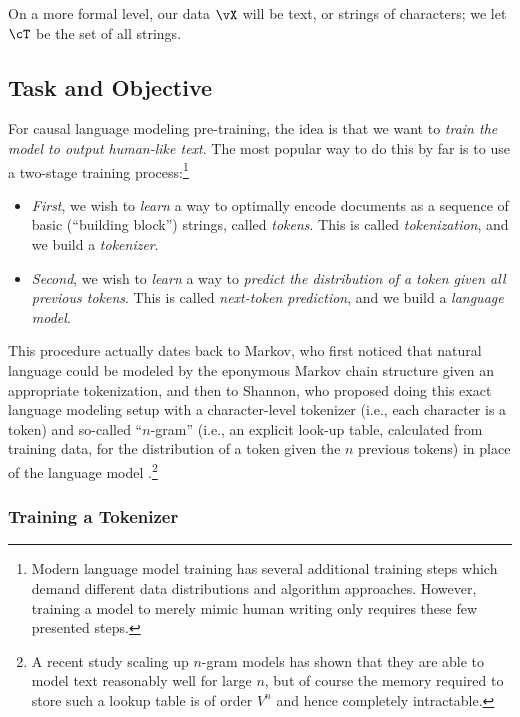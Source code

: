 \documentclass[../../book-main.tex]{subfiles}
\begin{document}
On a more formal level, our data \(\vX\) will be text, or strings of
characters; we let \(\cT\) be the set of all strings.

\subsection{Task and Objective} \label{sub:clm_text_objective}

For causal language modeling pre-training, the idea is that we want
to \textit{train the model to output human-like text}. The most
popular way to do this by far is to use a two-stage training
process:\footnote{Modern language model training has several
additional training steps which demand different data distributions
and algorithm approaches. However, training a model to merely mimic
human writing only requires these few presented steps.}
\begin{itemize}
\item \textit{First}, we wish to \textit{learn} a way to optimally
    encode documents as a sequence of basic (``building block'')
    strings, called \textit{tokens}. This is called
    \textit{tokenization}, and we build a \textit{tokenizer}.
\item \textit{Second}, we wish to \textit{learn} a way to
    \textit{predict the distribution of a token given all previous
    tokens}. This is called \textit{next-token prediction}, and we
    build a \textit{language model}.
\end{itemize}
This procedure actually dates back to Markov, who first noticed that
natural language could be modeled by the eponymous Markov chain
structure \citep{markov2006example} given an appropriate
tokenization, and then to Shannon, who proposed doing this exact
language modeling setup with a character-level tokenizer (i.e., each
character is a token) and so-called ``\(n\)-gram'' (i.e., an explicit
look-up table, calculated from training data, for the distribution of
a token given the \(n\) previous tokens) in place of the language
model \citep{Shannon-1948}.\footnote{A recent study
\citep{liu2024infini} scaling up \(n\)-gram models has shown that
they are able to model text reasonably well for large \(n\), but of
course the memory required to store such a lookup 
table is of order
\(V^{n}\) and hence completely intractable.}

\subsubsection{Training a Tokenizer}
\end{document}
